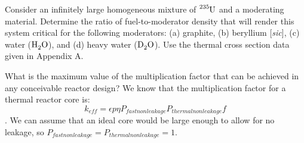 \documentclass{hw}
\begin{document}
	Consider an infinitely large homogeneous mixture of $ \ce{^{235}U} $ and a moderating material. Determine the ratio of fuel-to-moderator density that will render this system critical for the following moderators: (a) graphite, (b) beryllium [\textit{sic}], (c) water ($ \ce{H_{2}O} $), and (d) heavy water ($ \ce{D_{2}O} $). Use the thermal cross section data given in Appendix A.
\solution

	What is the maximum value of the multiplication factor that can be achieved in any conceivable reactor design?
\solution
	We know that the multiplication factor for a thermal reactor core is: \[ k_{eff} = \epsilon p \eta P_{fast non leakage} P_{thermal non leakage} f \]. We can assume that an ideal core would be large enough to allow for no leakage, so $ P_{fast non leakage} = P_{thermal non leakage} = 1 $.
\end{document}
